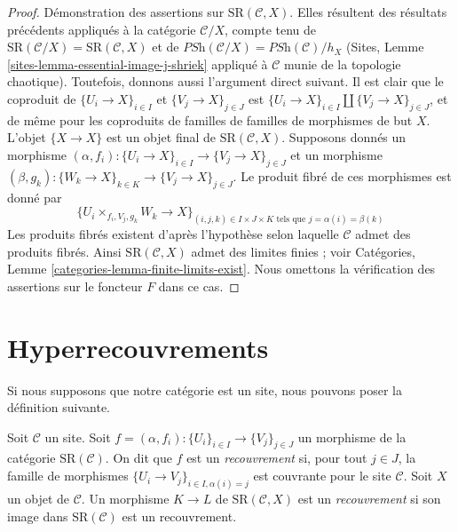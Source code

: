 \begin{proof}
\medskip\noindent
Démonstration des assertions sur $\text{SR}(\mathcal{C}, X)$.
Elles résultent des résultats précédents appliqués à la catégorie
$\mathcal{C}/X$, compte tenu de
$\text{SR}(\mathcal{C}/X) = \text{SR}(\mathcal{C}, X)$ et de
$\textit{PSh}(\mathcal{C}/X) = \textit{PSh}(\mathcal{C})/h_X$
(Sites, Lemme \ref{sites-lemma-essential-image-j-shriek} appliqué
à $\mathcal{C}$ munie de la topologie chaotique). Toutefois,
donnons aussi l'argument direct suivant.
Il est clair que le coproduit de
$\{U_i \to X\}_{i \in I}$ et $\{V_j \to X\}_{j \in J}$
est $\{U_i \to X\}_{i \in I} \amalg \{V_j \to X\}_{j \in J}$,
et de même pour les coproduits de
familles de familles de morphismes de but $X$.
L'objet $\{X \to X\}$ est un objet final
de $\text{SR}(\mathcal{C}, X)$.
Supposons donnés un morphisme
$(\alpha, f_i) : \{U_i \to X\}_{i \in I} \to \{V_j \to X\}_{j \in J}$
et un morphisme
$(\beta, g_k) : \{W_k \to X\}_{k \in K} \to \{V_j \to X\}_{j \in J}$.
Le produit fibré de ces morphismes est donné par
$$
\{ U_i \times_{f_i, V_j, g_k} W_k \to X \}_{(i, j, k) \in I \times J \times K
\text{ tels que } j = \alpha(i) = \beta(k)}
$$
Les produits fibrés existent d'après l'hypothèse selon laquelle
$\mathcal{C}$ admet des produits fibrés.
Ainsi $\text{SR}(\mathcal{C}, X)$ admet des limites finies ;
voir Catégories, Lemme \ref{categories-lemma-finite-limits-exist}.
Nous omettons la vérification des assertions sur le foncteur $F$ dans ce cas.
\end{proof}





\section{Hyperrecouvrements}
\label{section-hypercoverings}

\noindent
Si nous supposons que notre catégorie est un site, nous pouvons poser la
définition suivante.

\begin{definition}
\label{definition-covering-SR}
Soit $\mathcal{C}$ un site. Soit
$f = (\alpha, f_i) : \{U_i\}_{i \in I} \to \{V_j\}_{j \in J}$
un morphisme de la catégorie $\text{SR}(\mathcal{C})$.
On dit que $f$ est un {\it recouvrement} si, pour tout $j \in J$, la
famille de morphismes $\{U_i \to V_j\}_{i \in I, \alpha(i) = j}$
est couvrante pour le site $\mathcal{C}$.
Soit $X$ un objet de $\mathcal{C}$.
Un morphisme $K \to L$ de $\text{SR}(\mathcal{C}, X)$ est
un {\it recouvrement} si son image dans $\text{SR}(\mathcal{C})$ est
un recouvrement.
\end{definition}

